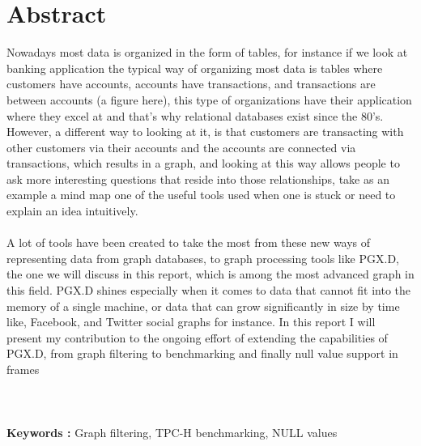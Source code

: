\chapter*{Abstract}
Nowadays most data is organized in the form of tables, for instance if we look at banking application the typical way of organizing most data is tables where customers have accounts, accounts have transactions, and transactions are between accounts (a figure here), this type of organizations have their application where they excel at and that’s why relational databases exist since the 80’s. However, a different way to looking at it, is that customers are transacting with other customers via their accounts and the accounts are connected via transactions, which results in a graph, and looking at this way allows people to ask more interesting questions that reside into those relationships, take as an example a mind map one of the useful tools used when one is stuck or need to explain an idea intuitively. 
\\ \\
A lot of tools have been created to take the most from these new ways of representing data from graph databases, to graph processing tools like PGX.D, the one we will discuss in this report, which is among the most advanced graph in this field. PGX.D shines especially when it comes to data that cannot fit into the memory of a single machine, or data that can grow significantly in size by time like, Facebook, and Twitter social graphs for instance. In this report I will present my contribution to the ongoing effort of extending the capabilities of PGX.D, from graph filtering to benchmarking and finally null value support in frames
\\ \\ \\ \\
\noindent\textbf{Keywords :} Graph filtering, TPC-H benchmarking, NULL values

\newpage





